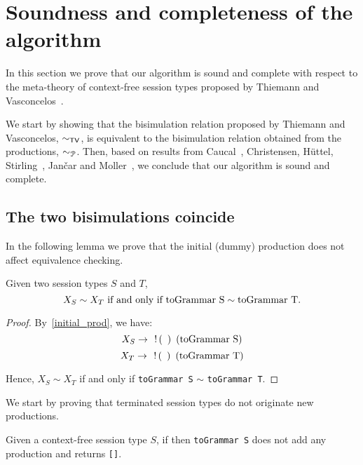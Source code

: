 \section{Soundness and completeness of the algorithm}
\label{sec:soundness}

In this section we prove that our algorithm is sound and complete
with respect to the meta-theory of context-free session types proposed
by Thiemann and Vasconcelos~\cite{thiemann2016context}.

We start by showing that the bisimulation relation proposed by
Thiemann and Vasconcelos, $\sim_{\mathsf{TV}}$, is equivalent to the
bisimulation relation obtained from the productions, $\sim_{\mathcal{P}}$.
Then, based on results from Caucal~\cite{caucal1986decidabilite},
Christensen, H{\"{u}}ttel,
Stirling~\cite{DBLP:journals/iandc/ChristensenHS95},
Jan{\v{c}}ar and Moller~\cite{janvcar1999techniques}, we conclude that
our algorithm is sound and complete.

\subsection{The two bisimulations coincide}

In the following lemma we prove that the initial (dummy) production
does not affect equivalence checking.
\begin{lemma}
	Given two session types $S$ and $T$,
	\[ X_{S} \sim X_{T}  \text{ if and only if }
	\text{\lstinline{toGrammar S}} \sim \text{\lstinline{toGrammar T}}.\]
\end{lemma}

\begin{proof}
	By~\eqref{initial_prod}, we have:
	\[X_S \rightarrow \enspace \initialProd\enspace \text{(\lstinline{toGrammar S})}\]
    \[X_T \rightarrow \enspace \initialProd\enspace \text{(\lstinline{toGrammar T})}\]

Hence, $X_S\sim X_T$ if and only if
\lstinline{toGrammar S} $\sim$ \lstinline{toGrammar T}.
\end{proof}

We start by proving that terminated session types
do not originate new productions.

\begin{lemma}
\label{lemma:terminated_session}
	Given a context-free session type $S$,
	if  then \lstinline{toGrammar S} does not add any
	production and returns \lstinline{[]}.
\end{lemma}

